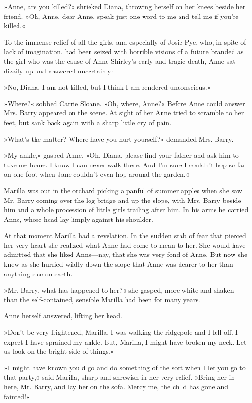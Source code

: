 »Anne, are you killed?« shrieked Diana, throwing herself on her knees beside her friend. »Oh, Anne, dear Anne, speak just one word to me and tell me if you’re killed.«

To the immense relief of all the girls, and especially of Josie Pye, who, in spite of lack of imagination, had been seized with horrible visions of a future branded as the girl who was the cause of Anne Shirley’s early and tragic death, Anne sat dizzily up and answered uncertainly:

»No, Diana, I am not killed, but I think I am rendered unconscious.«

»Where?« sobbed Carrie Sloane. »Oh, where, Anne?« Before Anne could answer Mrs. Barry appeared on the scene. At sight of her Anne tried to scramble to her feet, but sank back again with a sharp little cry of pain.

»What’s the matter? Where have you hurt yourself?« demanded Mrs. Barry.

»My ankle,« gasped Anne. »Oh, Diana, please find your father and ask him to take me home. I know I can never walk there. And I’m sure I couldn’t hop so far on one foot when Jane couldn’t even hop around the garden.«

Marilla was out in the orchard picking a panful of summer apples when she saw Mr. Barry coming over the log bridge and up the slope, with Mrs. Barry beside him and a whole procession of little girls trailing after him. In his arms he carried Anne, whose head lay limply against his shoulder.

At that moment Marilla had a revelation. In the sudden stab of fear that pierced her very heart she realized what Anne had come to mean to her. She would have admitted that she liked Anne—nay, that she was very fond of Anne. But now she knew as she hurried wildly down the slope that Anne was dearer to her than anything else on earth.

»Mr. Barry, what has happened to her?« she gasped, more white and shaken than the self-contained, sensible Marilla had been for many years.

Anne herself answered, lifting her head.

»Don’t be very frightened, Marilla. I was walking the ridgepole and I fell off. I expect I have sprained my ankle. But, Marilla, I might have broken my neck. Let us look on the bright side of things.«

»I might have known you’d go and do something of the sort when I let you go to that party,« said Marilla, sharp and shrewish in her very relief. »Bring her in here, Mr. Barry, and lay her on the sofa. Mercy me, the child has gone and fainted!«

